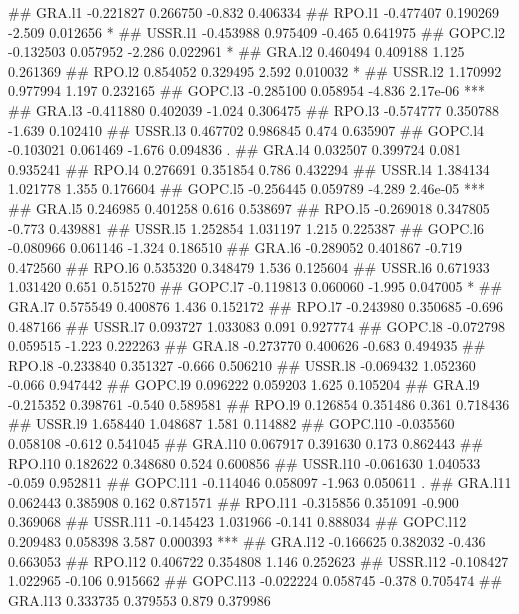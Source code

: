 \documentclass[
]{article}
\begin{document}
\begin{itemize}
## GRA.l1   -0.221827   0.266750  -0.832 0.406334    
## RPO.l1   -0.477407   0.190269  -2.509 0.012656 *  
## USSR.l1  -0.453988   0.975409  -0.465 0.641975    
## GOPC.l2  -0.132503   0.057952  -2.286 0.022961 *  
## GRA.l2    0.460494   0.409188   1.125 0.261369    
## RPO.l2    0.854052   0.329495   2.592 0.010032 *  
## USSR.l2   1.170992   0.977994   1.197 0.232165    
## GOPC.l3  -0.285100   0.058954  -4.836 2.17e-06 ***
## GRA.l3   -0.411880   0.402039  -1.024 0.306475    
## RPO.l3   -0.574777   0.350788  -1.639 0.102410    
## USSR.l3   0.467702   0.986845   0.474 0.635907    
## GOPC.l4  -0.103021   0.061469  -1.676 0.094836 .  
## GRA.l4    0.032507   0.399724   0.081 0.935241    
## RPO.l4    0.276691   0.351854   0.786 0.432294    
## USSR.l4   1.384134   1.021778   1.355 0.176604    
## GOPC.l5  -0.256445   0.059789  -4.289 2.46e-05 ***
## GRA.l5    0.246985   0.401258   0.616 0.538697    
## RPO.l5   -0.269018   0.347805  -0.773 0.439881    
## USSR.l5   1.252854   1.031197   1.215 0.225387    
## GOPC.l6  -0.080966   0.061146  -1.324 0.186510    
## GRA.l6   -0.289052   0.401867  -0.719 0.472560    
## RPO.l6    0.535320   0.348479   1.536 0.125604    
## USSR.l6   0.671933   1.031420   0.651 0.515270    
## GOPC.l7  -0.119813   0.060060  -1.995 0.047005 *  
## GRA.l7    0.575549   0.400876   1.436 0.152172    
## RPO.l7   -0.243980   0.350685  -0.696 0.487166    
## USSR.l7   0.093727   1.033083   0.091 0.927774    
## GOPC.l8  -0.072798   0.059515  -1.223 0.222263    
## GRA.l8   -0.273770   0.400626  -0.683 0.494935    
## RPO.l8   -0.233840   0.351327  -0.666 0.506210    
## USSR.l8  -0.069432   1.052360  -0.066 0.947442    
## GOPC.l9   0.096222   0.059203   1.625 0.105204    
## GRA.l9   -0.215352   0.398761  -0.540 0.589581    
## RPO.l9    0.126854   0.351486   0.361 0.718436    
## USSR.l9   1.658440   1.048687   1.581 0.114882    
## GOPC.l10 -0.035560   0.058108  -0.612 0.541045    
## GRA.l10   0.067917   0.391630   0.173 0.862443    
## RPO.l10   0.182622   0.348680   0.524 0.600856    
## USSR.l10 -0.061630   1.040533  -0.059 0.952811    
## GOPC.l11 -0.114046   0.058097  -1.963 0.050611 .  
## GRA.l11   0.062443   0.385908   0.162 0.871571    
## RPO.l11  -0.315856   0.351091  -0.900 0.369068    
## USSR.l11 -0.145423   1.031966  -0.141 0.888034    
## GOPC.l12  0.209483   0.058398   3.587 0.000393 ***
## GRA.l12  -0.166625   0.382032  -0.436 0.663053    
## RPO.l12   0.406722   0.354808   1.146 0.252623    
## USSR.l12 -0.108427   1.022965  -0.106 0.915662    
## GOPC.l13 -0.022224   0.058745  -0.378 0.705474    
## GRA.l13   0.333735   0.379553   0.879 0.379986    

\end{itemize}
\end{document}
